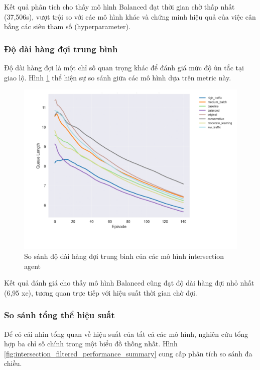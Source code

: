 Kết quả phân tích cho thấy mô hình Balanced đạt thời gian chờ thấp nhất (37,506s), vượt trội so với các mô hình khác và chứng minh hiệu quả của việc cân bằng các siêu tham số (hyperparameter).

\subsubsection{Độ dài hàng đợi trung bình}
Độ dài hàng đợi là một chỉ số quan trọng khác để đánh giá mức độ ùn tắc tại giao lộ. Hình \ref{fig:intersection_filtered_queue_length} thể hiện sự so sánh giữa các mô hình dựa trên metric này.

\begin{figure}[!htp]
    \centering
    \includegraphics[width=\textwidth]{figures/individual_plots/intersection_filtered_queue_length.png}
    \caption{So sánh độ dài hàng đợi trung bình của các mô hình intersection agent}
    \label{fig:intersection_filtered_queue_length}
\end{figure}

Kết quả đánh giá cho thấy mô hình Balanced cũng đạt độ dài hàng đợi nhỏ nhất (6,95 xe), tương quan trực tiếp với hiệu suất thời gian chờ đợi.

\subsubsection{So sánh tổng thể hiệu suất}
Để có cái nhìn tổng quan về hiệu suất của tất cả các mô hình, nghiên cứu tổng hợp ba chỉ số chính trong một biểu đồ thống nhất. Hình \ref{fig:intersection_filtered_performance_summary} cung cấp phân tích so sánh đa chiều.


